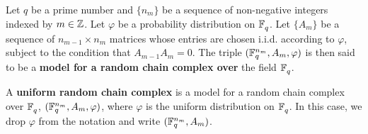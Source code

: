 


\begin{definition}
  Let $q$ be a prime number and $\{n_m\}$ be a sequence of non-negative integers indexed by $m \in \mathbb{Z}$. Let $\varphi$ be a probability distribution on $\mathbb{F}_q^{}$. Let $\{A_m\}$ be a sequence of $n_{m-1}\times n_{m}$ matrices whose entries are chosen i.i.d. according to $\varphi$, subject to the condition that $A_{m-1}A_m = 0$.  The triple $(\mathbb{F}_q^{n_m},A_m,\varphi)$ is then said to be a {\bf  model for a random chain complex over} the field $\mathbb{F}_q^{}$.
\end{definition}



\begin{definition}
  A {\bf uniform random chain complex} is a model for a random chain complex over $\mathbb{F}_q^{}$, $(\mathbb{F}_q^{n_m},A_m,\varphi)$, where $\varphi$ is the uniform distribution on $\mathbb{F}_q^{}$. In this case, we drop $\varphi$ from the notation and write $(\mathbb{F}_q^{n_m}, A_m)$.
  \label{defn:random_chain_cx}
\end{definition}

